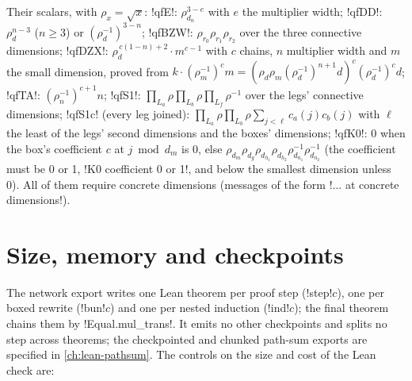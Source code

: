 {Their scalars, with $\rho_x = \sqrt{x}$:
\code!qfE!: $\rho_{d_n}^{3-e}$ with $e$ the multiplier width;
\code!qfDD!: $\rho_{d}^{n-3}$ ($n\ge3$) or $(\rho_d^{-1})^{3-n}$;
\code!qfBZW!: $\rho_{r_0}\rho_{r_1}\rho_{r_2}$ over the three connective dimensions;
\code!qfDZX!: $\rho_{d}^{\,c(1-n)+2}\cdot m^{c-1}$ with $c$ chains, $n$ multiplier width and $m$
the small dimension, proved from
$k\cdot(\rho_m^{-1})^{c}m = (\rho_d\rho_m(\rho_d^{-1})^{n+1}d)^{c}(\rho_d^{-1})^{c}d$;
\code!qfTA!: $(\rho_n^{-1})^{c+1}n$;
\code!qfS1!: $\prod_{L_a}\rho\prod_{L_b}\rho\prod_{L_f}\rho^{-1}$ over the legs' connective
dimensions; \code!qfS1c! (every leg joined): $\prod_{L_a}\rho\prod_{L_b}\rho\sum_{j<\ell}
c_a(j)c_b(j)$ with $\ell$ the least of the legs' second dimensions and the boxes' dimensions;
\code!qfK0!: 0 when the box's coefficient $c$ at $j \bmod d_m$ is 0, else
$\rho_{d_m}\rho_{d_g}\rho_{d_{h_1}}\rho_{d_{h_2}}\rho_{d_{n_1}}^{-1}\rho_{d_{n_2}}^{-1}$
(the coefficient must be 0 or 1, \code!K0 coefficient 0 or 1!, and below the smallest dimension
unless 0). All of them require concrete dimensions (messages of the form
\code!... at concrete dimensions!).

\section{Size, memory and checkpoints}\label{sec:lean-export-net-size}

The network export writes one Lean theorem per proof step (\code!step!$c$), one per boxed
rewrite (\code!bun!$c$) and one per nested induction (\code!ind!$c$); the final theorem chains
them by \lean!Equal.mul_trans!. It emits no other checkpoints and splits no step across theorems;
the checkpointed and chunked path-sum exports are specified in \cref{ch:lean-pathsum}. The
controls on the size and cost of the Lean check are:

}
